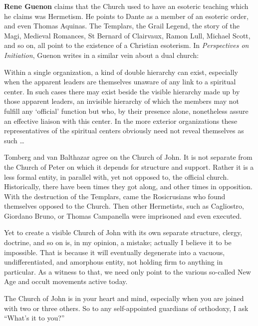 \textbf{Rene Guenon} claims that the Church used to have an esoteric teaching which he claims was Hermetism. He points
to Dante as a member of an esoteric order, and even Thomas Aquinas. The Templars, the Grail Legend, the story of the
Magi, Medieval Romances, St Bernard of Clairvaux, Ramon Lull, Michael Scott, and so on, all point to the existence of a
Christian esoterism. In \emph{Perspectives on Initiation}, Guenon writes in a similar vein about a dual church:

\begin{quotationx}
Within a single organization, a kind of double hierarchy can exist, especially when the apparent leaders are themselves
unaware of any link to a spiritual center. In such cases there may exist beside the visible hierarchy made up by those
apparent leaders, an invisible hierarchy of which the members may not fulfill any `official’ function but who, by their presence alone, nonetheless assure an effective liaison with this center. In the more
exterior organizations these representatives of the spiritual centers obviously need not reveal themselves as such …

\end{quotationx}
Tomberg and van Balthazar agree on the Church of John. It is not separate from the Church of Peter on which it depends
for structure and support. Rather it is a less formal entity, in parallel with, yet not opposed to, the official
church. Historically, there have been times they got along, and other times in opposition. With the destruction of the
Templars, came the Rosicrusians who found themselves opposed to the Church. Then other Hermetists, such as Cagliostro,
Giordano Bruno, or Thomas Campanella were imprisoned and even executed.

Yet to create a visible Church of John with its own separate structure, clergy, doctrine, and so on is, in my opinion, a
mistake; actually I believe it to be impossible. That is because it will eventually degenerate into a vacuous,
undifferentiated, and amorphous entity, not holding firm to anything in particular. As a witness to that, we need only
point to the various so-called New Age and occult movements active today.

The Church of John is in your heart and mind, especially when you are joined with two or three others. So to any
self-appointed guardians of orthodoxy, I ask “What's it to you?”

